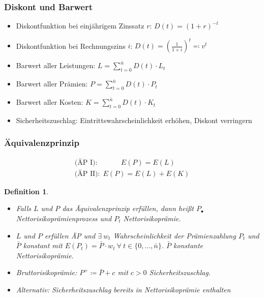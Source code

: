 \documentclass[12pt]{report}
\theoremstyle{dotless}
\newtheorem{defn}[thm]{Definition}
\theoremstyle{definition}
\begin{document}
\subsubsection{Diskont und Barwert}
\begin{itemize}
	\item Diskontfunktion bei einjährigem Zinssatz $r$: $D(t)=(1+r)^{-t}$
	\item Diskontfunktion bei Rechnungszins $i$: $D(t) = (\frac{1}{1+i})^t \eqqcolon v^t$
	\item Barwert aller Leistungen: $L=\sum_{t=0}^{\bar{n}}D(t)\cdot L_t$
	\item Barwert aller Prämien: $P=\sum_{t=0}^{\bar{n}}D(t)\cdot P_t$
	\item Barwert aller Kosten: $K=\sum_{t=0}^{\bar{n}}D(t)\cdot K_t$
	\item Sicherheitszuschlag: Eintrittswahrscheinlichkeit erhöhen, Diskont verringern
\end{itemize}

\subsubsection{Äquivalenzprinzip}
\begin{align}
	\text{(ÄP I):} \ \ \ \ \ \ \ \ \ \ \ \ \ \ \ E(P)=E(L) \\
	\text{(ÄP II):} \ \ E(P)=E(L)+E(K)
\end{align} 

\begin{defn} \ \\
	\begin{itemize}
		\item Falls $L$ und $P$ das Äquivalenzprinzip erfüllen, dann hei{\ss}t $P_{\bullet}$ Nettorisikoprämienprozess und $P_t$ Nettorisikoprämie.
		\item $L$ und $P$ erfüllen ÄP und $\exists \ w_t$ Wahrscheinlichkeit der Prämienzahlung $P_t$ und $\bar{P}$ konstant mit $E(P_t)=\bar{P}\cdot w_t \ \forall \ t \in \{0,...,\bar{n}\}$. $\bar{P}$ konstante Nettorisikoprämie.
		\item Bruttorisikoprämie: $P^+ \coloneqq \bar{P}+c$ mit $c>0$ Sicherheitszuschlag.
		\item Alternativ: Sicherheitszuschlag bereits in Nettorisikoprämie enthalten
	\end{itemize}
\end{defn}
\end{document}
